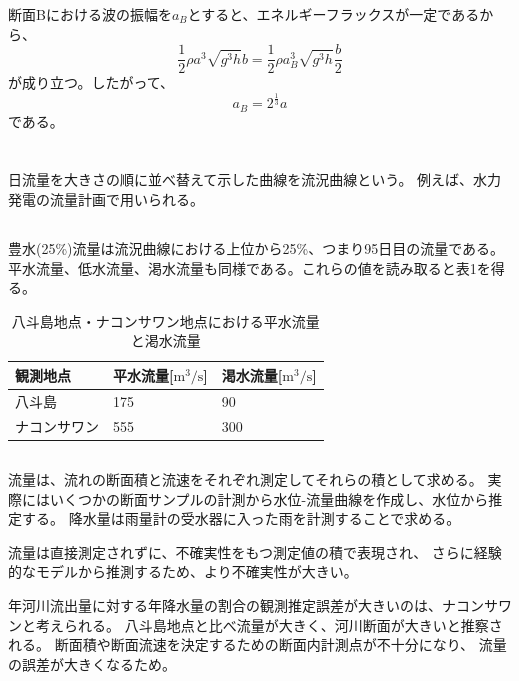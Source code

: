 \documentclass[a4paper]{jsarticle}
\begin{document}
\subsubsection{}
断面Bにおける波の振幅を$a_B$とすると、エネルギーフラックスが一定であるから、
\begin{equation}
  \frac{1}{2} \rho a^3 \sqrt{g^3 h} b
  = \frac{1}{2} \rho a_B^3 \sqrt{g^3 h} \frac{b}{2}
\end{equation}
が成り立つ。したがって、
\begin{equation}
  a_B = 2^{\frac{1}{3}} a
\end{equation}
である。

\section{}
\subsection{}
日流量を大きさの順に並べ替えて示した曲線を流況曲線という。
例えば、水力発電の流量計画で用いられる。

\subsection{}
豊水(25\%)流量は流況曲線における上位から25\%、つまり95日目の流量である。
平水流量、低水流量、渇水流量も同様である。これらの値を読み取ると表1を得る。
\begin{table}[htb]
  \caption{八斗島地点・ナコンサワン地点における平水流量と渇水流量}
  \centering
  \begin{tabular}{l|ll}
    観測地点 & 平水流量[$\mathrm{m^3/s}$] & 渇水流量[$\mathrm{m^3/s}$] \\ \hline
    八斗島 & 175 & 90 \\
    ナコンサワン & 555 & 300 \\ \hline
  \end{tabular}
\end{table}

\subsection{}
流量は、流れの断面積と流速をそれぞれ測定してそれらの積として求める。
実際にはいくつかの断面サンプルの計測から水位-流量曲線を作成し、水位から推定する。
降水量は雨量計の受水器に入った雨を計測することで求める。\par
流量は直接測定されずに、不確実性をもつ測定値の積で表現され、
さらに経験的なモデルから推測するため、より不確実性が大きい。\par
年河川流出量に対する年降水量の割合の観測推定誤差が大きいのは、ナコンサワンと考えられる。
八斗島地点と比べ流量が大きく、河川断面が大きいと推察される。
断面積や断面流速を決定するための断面内計測点が不十分になり、
流量の誤差が大きくなるため。
\end{document}
